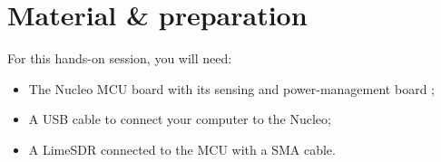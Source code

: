 \section*{Material \& preparation}

\begin{comment}[couleur = gray!20, arrondi = 0.2, logo=\bcinfo]{}
\vspace{0.2cm}
\end{comment}
For this hands-on session, you will need:
\begin{itemize}
    \item The Nucleo MCU board with its sensing and power-management board ;
    \item A USB cable to connect your computer to the Nucleo;
    \item A LimeSDR connected to the MCU with a SMA cable.
\end{itemize}
